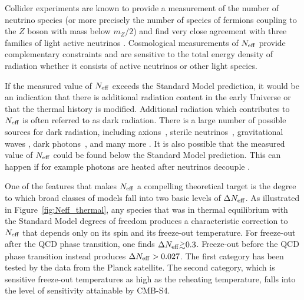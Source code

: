 Collider experiments are known to provide a measurement of the number of neutrino species (or more precisely the number of species of fermions coupling to the $Z$ boson with mass below $m_Z/2$) and find very close agreement with three families of light active neutrinos \cite{ALEPH:2005ab}.  Cosmological measurements of $N_{\rm eff}$ provide complementary constraints and are sensitive to the total energy density of radiation whether it consists of active neutrinos or other light species.

If the measured value of $N_{\rm eff}$ exceeds the Standard Model prediction, it would be an indication that there is additional radiation content in the early Universe or that the thermal history is modified.  Additional radiation which contributes to $N_{\rm eff}$ is often referred to as dark radiation.  There is a large number of possible sources for dark radiation, including axions~\cite{Brust:2013xpv,Salvio:2013iaa,Kawasaki:2015ofa,Baumann:2016wac}, sterile neutrinos~\cite{Abazajian:2001nj,Strumia:2006db,Boyarsky:2009ix}, gravitational waves \cite{Boyle:2007zx,Stewart:2007fu,Meerburg:2015zua}, dark photons~\cite{Ackerman:2008gi,Kaplan:2011yj,CyrRacine:2012fz}, and many more \cite{Cadamuro:2010cz,Weinberg:2013kea,Arkani-Hamed:2016rle}.  It is also possible that the measured value of $N_{\rm eff}$ could be found below the Standard Model prediction.  This can happen if for example photons are heated after neutrinos decouple \cite{Steigman:2013yua,Boehm:2013jpa}.

One of the features that makes $N_{\rm eff}$ a compelling theoretical target is the degree to which broad classes of models fall into two basic levels of $\Delta N_{\rm eff}$.  As illustrated in Figure~\ref{fig:Neff_thermal}, any species that was in thermal equilibrium with the Standard Model degrees of freedom produces a characteristic correction to $N_{\rm eff}$ that depends only on its spin and its freeze-out temperature.  For freeze-out after the QCD phase transition, one finds $\Delta \Neff \gtrsim 0.3$.  Freeze-out before the QCD phase transition instead produces $\Delta N_{\rm eff} > 0.027$.  The first category has been tested by the data from the Planck satellite.  The second category, which is sensitive freeze-out temperatures as high as the reheating temperature, falls into the level of sensitivity attainable by CMB-S4.

